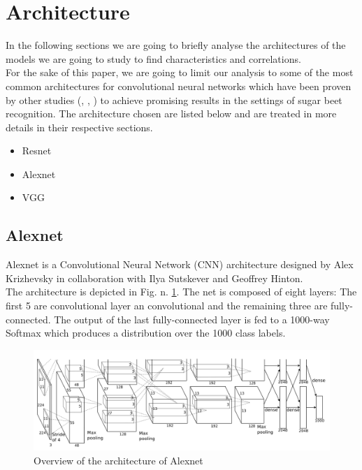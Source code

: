 \section{Architecture}\label{sec:arch}
In the following sections we are going to briefly analyse the architectures of the models we are going to study to find characteristics and correlations. \\
For the sake of this paper, we are going to limit our analysis to some of the most common architectures for convolutional neural networks which have been proven by other studies (\cite{suh_transfer_2018}, \cite{s20205893}, \cite{phdthesis}) to achieve promising results in the settings of sugar beet recognition. The architecture chosen are listed below and are treated in more details in their respective sections. 
\begin{itemize}
\item Resnet
\item Alexnet
\item VGG
\end{itemize}
\subsection{Alexnet}
Alexnet is a Convolutional Neural Network (CNN) architecture designed by  Alex Krizhevsky in collaboration with Ilya Sutskever and Geoffrey Hinton. \cite{NIPS2012_c399862d}\\
The architecture is depicted in Fig. n. \ref{fig:alexnet_architecture}. The net is composed of eight layers:
The first 5 are convolutional layer an convolutional and the remaining three are fully- connected. The output of the last fully-connected layer is fed to a 1000-way Softmax which produces a distribution over the 1000 class labels. \cite{NIPS2012_c399862d}\\
\begin{figure}[htb]
    \centering
    \includegraphics[scale = 0.4]{img/alexnet_architecture.png}
    \caption[Overview of the architecture of Alexnet]{Overview of the architecture of Alexnet \cite{NIPS2012_c399862d}}
    \label{fig:alexnet_architecture}
\end{figure}


